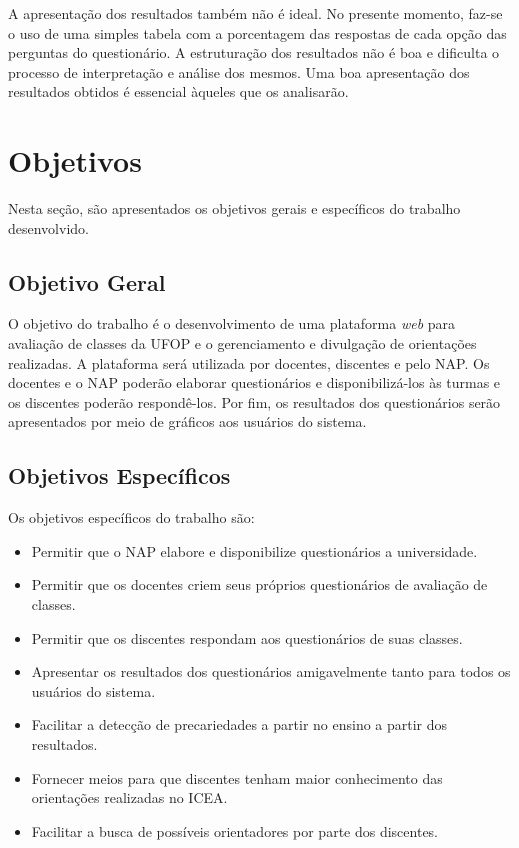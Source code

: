 \documentclass[
  12pt,       %
  openright,      %
  oneside,      %
  a4paper,      %
  english,      %
  french,        %
  spanish,     %
  brazil        %
  ]{abntex2-decsi}
\begin{document}
    A apresentação dos resultados também não é ideal. No presente momento, faz-se o uso de uma simples tabela com a porcentagem das respostas de cada opção das perguntas do questionário. A estruturação dos resultados não é boa e dificulta o processo de interpretação e análise dos mesmos. Uma boa apresentação dos resultados obtidos é essencial àqueles que os analisarão.

    \section{Objetivos}

        Nesta seção, são apresentados os objetivos gerais e específicos do trabalho desenvolvido.

        \subsection{Objetivo Geral}

    O objetivo do trabalho é o desenvolvimento de uma plataforma \textit{web} para avaliação de classes da UFOP e o gerenciamento e divulgação de orientações realizadas. A plataforma será utilizada por docentes, discentes e pelo NAP. Os docentes e o NAP poderão elaborar questionários e disponibilizá-los às turmas e os discentes poderão respondê-los. Por fim, os resultados dos questionários serão apresentados por meio de gráficos aos usuários do sistema.

        \subsection{Objetivos Específicos}

            Os objetivos específicos do trabalho são:

            \begin{itemize}
            	\item Permitir que o NAP elabore e disponibilize questionários a universidade.
                \item Permitir que os docentes criem seus próprios questionários de avaliação de classes.
                \item Permitir que os discentes respondam aos questionários de suas classes.
                \item Apresentar os resultados dos questionários amigavelmente tanto para todos os usuários do sistema.
                \item Facilitar a detecção de precariedades a partir no ensino a partir dos resultados.
                \item Fornecer meios para que discentes tenham maior conhecimento das orientações realizadas no ICEA.
                \item Facilitar a busca de possíveis orientadores por parte dos discentes.
            \end{itemize}
\end{document}
